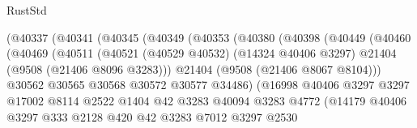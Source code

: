 \begin{lexlean}{RustStd}
\begin{coremodule}
                            (@40337
                              (@40341
                                (@40345
                                  (@40349
                                    (@40353
                                      (@40380
                                        (@40398
                                          (@40449
                                            (@40460
                                              (@40469
                                                (@40511
                                                  (@40521
                                                    (@40529 @40532)
                                                    (@14324 @40406 @3297)
                                                    @21404
                                                    (@9508 (@21406 @8096 @3283)))
                                                  @21404
                                                  (@9508 (@21406 @8067 @8104)))
                                                @30562
                                                @30565
                                                @30568
                                                @30572
                                                @30577
                                                @34486)
                                              (@16998
                                                @40406
                                                @3297
                                                @3297
                                                @17002
                                                @8114
                                                @2522
                                                @1404
                                                @42
                                                @3283
                                                @40094
                                                @3283
                                                @4772
                                                (@14179
                                                  @40406
                                                  @3297
                                                  @333
                                                  @2128
                                                  @420
                                                  @42
                                                  @3283
                                                  @7012
                                                  @3297
                                                  @2530

\end{coremodule}
\end{lexlean}
